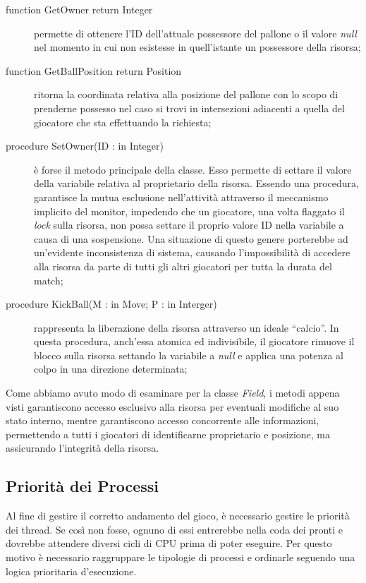 \documentclass[aps,letterpaper,10pt]{article}
\begin{document}
\begin{description}
\item[function GetOwner return Integer] permette di ottenere l'ID dell'attuale possessore del pallone o il valore
\emph{null} nel momento in cui non esistesse in quell'istante un possessore della risorsa;
\item[function GetBallPosition return Position] ritorna la coordinata relativa alla posizione del pallone con lo scopo
di prenderne possesso nel caso si trovi in intersezioni adiacenti a quella del giocatore che sta effettuando la
richiesta;
\item[procedure SetOwner(ID : in Integer)] \`e forse il metodo principale della classe. Esso permette di settare il
valore della variabile relativa al proprietario della risorsa. Essendo una procedura, garantisce la mutua esclusione
nell'attivit\`a attraverso il meccanismo implicito del monitor, impedendo che un giocatore, una volta flaggato il
\emph{lock} sulla risorsa, non possa settare il proprio valore ID nella variabile a causa di una sospensione. Una
situazione di questo genere porterebbe ad un'evidente inconsistenza di sistema, causando l'impossibilit\`a di accedere
alla risorsa da parte di tutti gli altri giocatori per tutta la durata del match;
\item[procedure KickBall(M : in Move; P : in Interger)] rappresenta la liberazione della risorsa attraverso un ideale
``calcio''. In questa procedura, anch'essa atomica ed indivisibile, il giocatore rimuove il blocco sulla risorsa
settando la variabile a \emph{null} e applica una potenza al colpo in una direzione determinata;
\end{description}

Come abbiamo avuto modo di esaminare per la classe \emph{Field}, i metodi appena visti garantiscono accesso esclusivo
alla risorsa per eventuali modifiche al suo stato interno, mentre garantiscono accesso concorrente alle informazioni,
permettendo a tutti i giocatori di identificarne proprietario e posizione, ma assicurando l'integrit\`a della risorsa.

\subsection{Priorit\`a dei Processi}
\label{priorita}

Al fine di gestire il corretto andamento del gioco, \`e necessario gestire le priorit\`a dei thread. Se cos\`i non
fosse, ognuno di essi entrerebbe nella coda dei pronti e dovrebbe attendere diversi cicli di CPU prima di poter
eseguire. Per questo motivo \`e necessario raggruppare le tipologie di processi e ordinarle seguendo una logica
prioritaria d'esecuzione. \vspace{3mm}
\end{document}
